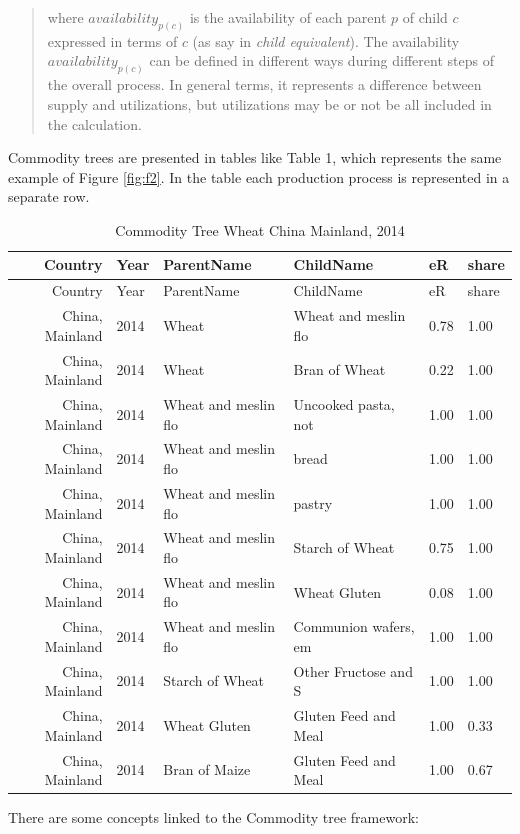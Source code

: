 \documentclass[]{article}
\begin{document}
\begin{quote}
where \(availability_{p(c)}\) is the availability of each parent \(p\)
of child \(c\) expressed in terms of \(c\) (as say in \emph{child
equivalent}). The availability \(availability_{p(c)}\) can be defined in
different ways during different steps of the overall process. In general
terms, it represents a difference between supply and utilizations, but
utilizations may be or not be all included in the calculation.
\end{quote}

Commodity trees are presented in tables like Table 1, which represents
the same example of Figure \ref{fig:f2}. In the table each production
process is represented in a separate row.

\begin{longtable}[]{@{}rlllll@{}}
\caption{Commodity Tree Wheat China Mainland, 2014}\tabularnewline
\toprule
Country & Year & ParentName & ChildName & eR & share\tabularnewline
\midrule
\endfirsthead
\toprule
Country & Year & ParentName & ChildName & eR & share\tabularnewline
\midrule
\endhead
China, Mainland & 2014 & Wheat & Wheat and meslin flo & 0.78 &
1.00\tabularnewline
China, Mainland & 2014 & Wheat & Bran of Wheat & 0.22 &
1.00\tabularnewline
China, Mainland & 2014 & Wheat and meslin flo & Uncooked pasta, not &
1.00 & 1.00\tabularnewline
China, Mainland & 2014 & Wheat and meslin flo & bread & 1.00 &
1.00\tabularnewline
China, Mainland & 2014 & Wheat and meslin flo & pastry & 1.00 &
1.00\tabularnewline
China, Mainland & 2014 & Wheat and meslin flo & Starch of Wheat & 0.75 &
1.00\tabularnewline
China, Mainland & 2014 & Wheat and meslin flo & Wheat Gluten & 0.08 &
1.00\tabularnewline
China, Mainland & 2014 & Wheat and meslin flo & Communion wafers, em &
1.00 & 1.00\tabularnewline
China, Mainland & 2014 & Starch of Wheat & Other Fructose and S & 1.00 &
1.00\tabularnewline
China, Mainland & 2014 & Wheat Gluten & Gluten Feed and Meal & 1.00 &
0.33\tabularnewline
China, Mainland & 2014 & Bran of Maize & Gluten Feed and Meal & 1.00 &
0.67\tabularnewline
\bottomrule
\end{longtable}

There are some concepts linked to the Commodity tree framework:
\end{document}
